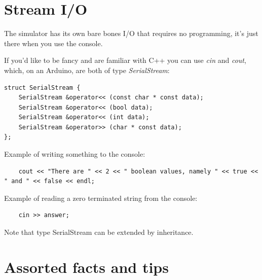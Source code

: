 \documentclass[a4paper,11pt]{article}
\begin{document}
\section{Stream I/O}

The simulator has its own bare bones I/O that requires no programming,
it's just there when you use the console.

If you'd like to be fancy and are familiar with C++ you can use \emph{cin} and \emph{cout},
which, on an Arduino, are both of type \emph{SerialStream}:

\begin{lstlisting}
struct SerialStream {
    SerialStream &operator<< (const char * const data);
    SerialStream &operator<< (bool data);
    SerialStream &operator<< (int data);
    SerialStream &operator>> (char * const data);
};
\end{lstlisting}
    
Example of writing something to the console:

\begin{lstlisting}
    cout << "There are " << 2 << " boolean values, namely " << true << " and " << false << endl;
\end{lstlisting}
    
Example of reading a zero terminated string from the console:

\begin{lstlisting}
    cin >> answer;
\end{lstlisting}
    
Note that type SerialStream can be extended by inheritance.
    
\section{Assorted facts and tips}
\end{document}
